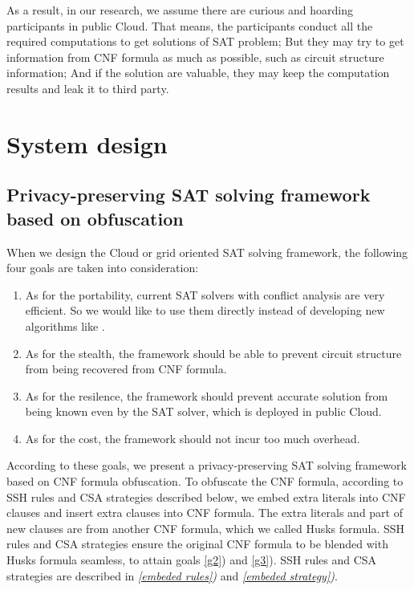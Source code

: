 \documentclass[conference,compsocconf]{IEEEtran}
\begin{document}
As a result,
in our research,
we assume there are
curious and hoarding participants\cite{HV-grid} in public Cloud.
That means,
the participants conduct all the required computations to get solutions of SAT problem;
But they may try to get information from CNF formula as much as possible, 
such as circuit structure information;
And if the solution are valuable, they may keep the computation results and leak it to third party.

\section{System design}

\subsection{Privacy-preserving SAT solving framework based on obfuscation}
When we design the Cloud or grid oriented SAT solving framework, the following four goals are taken into consideration:
\begin{enumerate}
 \item 
As for the portability, current SAT solvers with conflict analysis \cite{Minisat} are very efficient.
So we would like to use them directly 
instead of developing new algorithms like \cite{OBfuscationd-CNFs}.
 \item \label{g2}
As for the stealth\cite{obfuscationBible}, the framework should be able to prevent circuit structure from being recovered from CNF formula.
\item \label{g3}
As for the resilence\cite{obfuscationBible}, the framework should prevent accurate solution from being known even by the SAT solver, which is deployed in public Cloud.
 \item
As for the cost, the framework should not incur too much overhead.
\end{enumerate}

According to these goals,
we present a privacy-preserving SAT solving framework based on CNF formula obfuscation.
To obfuscate the CNF formula,
according to SSH rules and CSA strategies described below,
we embed extra literals into CNF clauses and insert extra clauses into CNF formula.
The extra literals and part of new clauses are from another CNF formula, which we called Husks formula.
SSH rules and CSA strategies ensure the original CNF formula to be blended with Husks formula seamless,
to attain goals  \ref{g2}) and \ref{g3}).
SSH rules and CSA strategies are described in \textit{\ref{embeded rules})} and \textit{\ref{embeded strategy})}.
\end{document}
